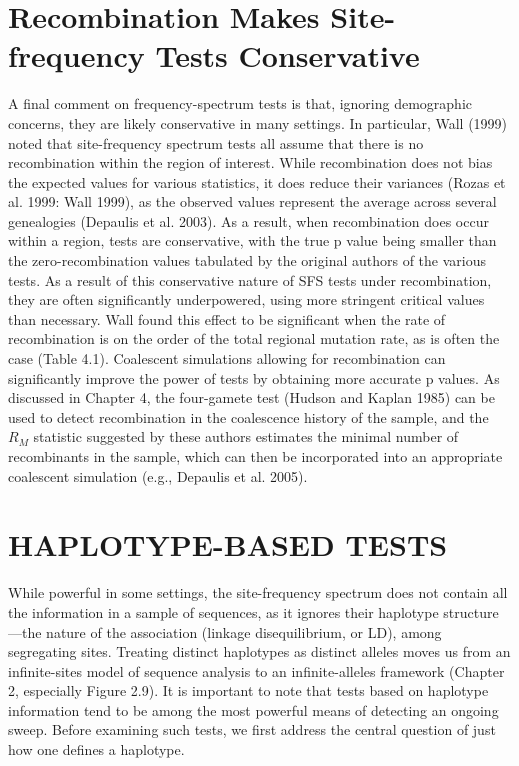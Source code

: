 \documentclass{article}
\begin{document}
\section{Recombination Makes Site-frequency Tests Conservative}
A final comment on frequency-spectrum tests is that, ignoring demographic concerns, they are likely conservative in many settings. In particular, Wall (1999) noted that site-frequency spectrum tests all assume that there is no recombination within the region of interest. While recombination does not bias the expected values for various statistics, it does reduce their variances (Rozas et al. 1999: Wall 1999), as the observed values represent the average across several genealogies (Depaulis et al. 2003). As a result, when recombination does occur within a region, tests are conservative, with the true p value being smaller than the zero-recombination values tabulated by the original authors of the various tests. As a result of this conservative nature of SFS tests under recombination, they are often significantly underpowered, using more stringent critical values than necessary. Wall found this effect to be significant when the rate of recombination is on the order of the total regional mutation rate, as is often the case (Table 4.1). Coalescent simulations allowing for recombination can significantly improve the power of tests by obtaining more accurate p values. As discussed in Chapter 4, the four-gamete test (Hudson and Kaplan 1985) can be used to detect recombination in the coalescence history of the sample, and the  $ R_{M} $ statistic suggested by these authors estimates the minimal number of recombinants in the sample, which can then be incorporated into an appropriate coalescent simulation (e.g., Depaulis et al. 2005).

\section{HAPLOTYPE-BASED TESTS}
While powerful in some settings, the site-frequency spectrum does not contain all the information in a sample of sequences, as it ignores their haplotype structure—the nature of the association (linkage disequilibrium, or LD), among segregating sites. Treating distinct haplotypes as distinct alleles moves us from an infinite-sites model of sequence analysis to an infinite-alleles framework (Chapter 2, especially Figure 2.9). It is important to note that tests based on haplotype information tend to be among the most powerful means of detecting an ongoing sweep. Before examining such tests, we first address the central question of just how one defines a haplotype.
\end{document}
